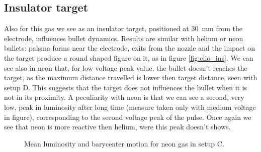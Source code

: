 \subsection{Insulator target}
Also for this gas we see as an insulator target, positioned at \SI{30}{\milli\meter} from the electrode, influences bullet dynamics.
Results are similar with helium or neon bullets: palsma forms near the electrode, exits from the nozzle and the impact on the target produce a round shaped figure on it, as in figure \ref{fig:elio_ins}. We can see also in neon that, for low voltage peak value, the bullet doesn't reaches the target, as the maximum distance travelled is lower then target distance, seen with setup D. This suggests that the target does not influences the bullet when it is not in its proximity.
A peculiarity with neon is that we can see a second, very low, peak in luminosity after long time (measure taken only with medium voltage in figure), corresponding to the second voltage peak of the pulse. Once again we see that neon is more reactive then helium, were this peak doesn't shows.
\begin{figure}
 \centering
 \hfill
 \caption{Mean luminosity and barycenter motion for neon gas in setup C.}
 \label{fig:neon_c_xb}
\end{figure}


